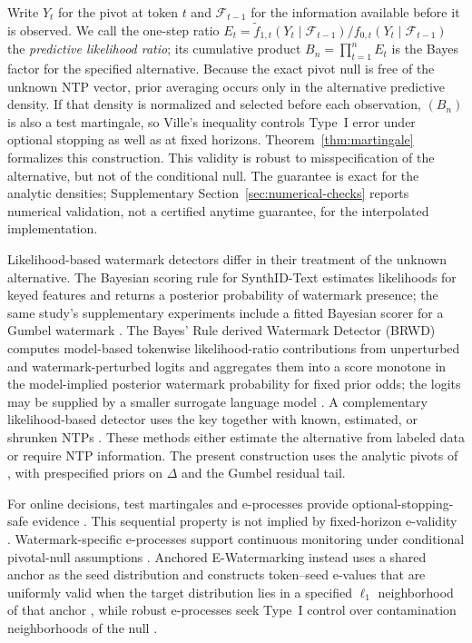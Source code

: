 \documentclass[11pt]{article}
\newcommand{\F}{\mathcal F}
\begin{document}
Write $Y_t$ for the pivot at token $t$ and $\F_{t-1}$ for the information available before it is observed.  We call the one-step ratio $E_t=\widetilde f_{1,t}(Y_t\mid\F_{t-1})/f_{0,t}(Y_t\mid\F_{t-1})$ the \emph{predictive likelihood ratio}; its cumulative product $B_n=\prod_{t=1}^n E_t$ is the Bayes factor for the specified alternative.  Because the exact pivot null is free of the unknown NTP vector, prior averaging occurs only in the alternative predictive density.  If that density is normalized and selected before each observation, $(B_n)$ is also a test martingale, so Ville's inequality controls Type~I error under optional stopping as well as at fixed horizons.  Theorem~\ref{thm:martingale} formalizes this construction.  This validity is robust to misspecification of the alternative, but not of the conditional null.  The guarantee is exact for the analytic densities; Supplementary Section~\ref{sec:numerical-checks} reports numerical validation, not a certified anytime guarantee, for the interpolated implementation.

Likelihood-based watermark detectors differ in their treatment of the unknown alternative.  The Bayesian scoring rule for SynthID-Text estimates likelihoods for keyed features and returns a posterior probability of watermark presence; the same study's supplementary experiments include a fitted Bayesian scorer for a Gumbel watermark \citep{dathathri2024synthid}.  The Bayes' Rule derived Watermark Detector (BRWD) computes model-based tokenwise likelihood-ratio contributions from unperturbed and watermark-perturbed logits and aggregates them into a score monotone in the model-implied posterior watermark probability for fixed prior odds; the logits may be supplied by a smaller surrogate language model \citep[Section~4.2]{huang2025brwd}.  A complementary likelihood-based detector uses the key together with known, estimated, or shrunken NTPs \citep{li2025likelihood}.  These methods either estimate the alternative from labeled data or require NTP information.  The present construction uses the analytic pivots of \citet{li2025framework}, with prespecified priors on $\Delta$ and the Gumbel residual tail.


For online decisions, test martingales and e-processes provide optional-stopping-safe evidence \citep{ville1939etude,shafer2011test,ramdas2023game,grunwald2024safe}.  This sequential property is not implied by fixed-horizon e-validity \citep{vovk2021evalues,ramdas2023game}.  Watermark-specific e-processes support continuous monitoring under conditional pivotal-null assumptions \citep{su2026eprocess,luo2026rao}.  Anchored E-Watermarking instead uses a shared anchor as the seed distribution and constructs token--seed e-values that are uniformly valid when the target distribution lies in a specified $\ell_1$ neighborhood of that anchor \citep{huang2026anytime}, while robust e-processes seek Type~I control over contamination neighborhoods of the null \citep{saha2026huber}.
\end{document}
